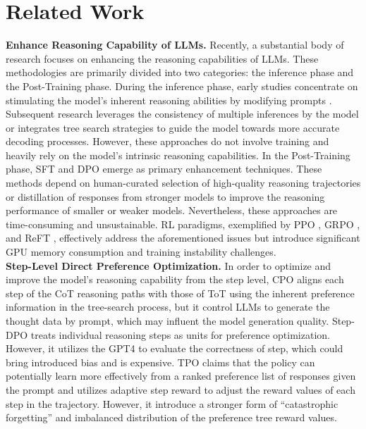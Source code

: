 \section{Related Work}
\textbf{Enhance Reasoning Capability of LLMs.}
Recently, a substantial body of research focuses on enhancing the reasoning capabilities of LLMs. These methodologies are primarily divided into two categories: the inference phase and the Post-Training phase. During the inference phase, early studies concentrate on stimulating the model's inherent reasoning abilities by modifying prompts \citep{cot,tot}. Subsequent research leverages the consistency of multiple inferences by the model \citep{self-rewarding,self-consistency} or integrates tree search strategies \citep{tsllm,rest-mcts} to guide the model towards more accurate decoding processes. However, these approaches do not involve training and heavily rely on the model's intrinsic reasoning capabilities. In the Post-Training phase, SFT \cite{tsllm} and DPO \cite{dpo,secret-q} emerge as primary enhancement techniques. These methods depend on human-curated selection of high-quality reasoning trajectories or distillation of responses from stronger models \cite{slow-thinking} to improve the reasoning performance of smaller or weaker models. Nevertheless, these approaches are time-consuming and unsustainable. RL paradigms, exemplified by PPO \citep{ppo}, GRPO \citep{deepseek-r1,deepseek-math}, and ReFT \citep{reft}, effectively address the aforementioned issues but introduce significant GPU memory consumption and training instability challenges. 
\\\textbf{Step-Level Direct Preference Optimization.}
In order to optimize and improve the model's reasoning capability from the step level, CPO \citep{cpo} aligns each step of the CoT reasoning paths with those of ToT using the inherent preference information in the tree-search process, but it control LLMs to generate the thought data by prompt, which may influent the model generation quality. Step-DPO \citep{step-dpo} treats individual reasoning steps as units for preference optimization. However, it utilizes the GPT4 to evaluate the correctness of step, which could bring introduced bias and is expensive.  TPO \citep{tpo} claims that the policy can potentially learn more effectively from a ranked preference list of responses given the prompt and utilizes adaptive step reward to adjust the reward values of each step in the trajectory.  However, it introduce a stronger form of ``catastrophic forgetting'' and imbalanced distribution of the preference tree reward values.


